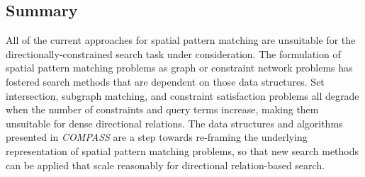 {%


\subsection{Summary}
\par{
    All of the current approaches for spatial pattern matching are unsuitable for the directionally-constrained search task under consideration.%
    The formulation of spatial pattern matching problems as graph or constraint network problems has fostered search methods that are dependent on those data structures. 
    Set intersection, subgraph matching, and constraint satisfaction problems all degrade when the number of constraints and query terms increase, making them unsuitable for dense directional relations. 
    The data structures and algorithms presented in \emph{COMPASS} are a step towards re-framing the underlying representation of spatial pattern matching problems, so that new search methods can be applied that scale reasonably for directional relation-based search.
}
}
